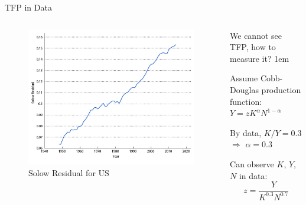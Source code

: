 \documentclass[11pt,aspectratio=43]{beamer} \usepackage[utf8]{inputenc}
\let\olditemize=\itemize
\let\endolditemize=\enditemize
\renewenvironment{itemize}{\olditemize \itemsep1em}{\endolditemize}
\theoremstyle{definition}
\begin{document}
\begin{frame}{TFP in Data}
\label{slide:TFP_in_Data}
    \begin{columns}
        \begin{column}{0.6\textwidth}
            \begin{figure}
                \caption{\alert{Solow Residual} for US}
                \includegraphics[width=\textwidth]{./figures/Figure4_18.jpg}
            \end{figure}
        \end{column}
        \begin{column}{0.4\textwidth}
            We cannot see TFP, \alert{how to measure it}?
            \begin{itemize}
                \item Assume Cobb-Douglas production function: $ Y = z K^{\alpha} N^{1-\alpha} $
                \item By data, $ K/Y = 0.3 $ $ \Rightarrow  $ $ \alpha = 0.3  $
                \item Can observe $ K $, $ Y $, $ N $ in data:
                \begin{equation*}
                   z = \frac{Y}{K^{0.3}N^{0.7}}
                \end{equation*}
            \end{itemize}
        \end{column}
    \end{columns}
\end{frame}
\end{document}
